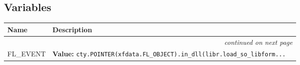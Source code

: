   \subsection{Variables}

    \vspace{-1cm}
\hspace{\varindent}\begin{longtable}{|p{\varnamewidth}|p{\vardescrwidth}|l}
\cline{1-2}
\cline{1-2} \centering \textbf{Name} & \centering \textbf{Description}& \\
\cline{1-2}
\endhead\cline{1-2}\multicolumn{3}{r}{\small\textit{continued on next page}}\\\endfoot\cline{1-2}
\endlastfoot\raggedright F\-L\-\_\-E\-V\-E\-N\-T\- & \raggedright \textbf{Value:} 
{\tt cty.POINTER(xfdata.FL\_OBJECT).in\_dll(libr.load\_so\_libform\texttt{...}}&\\
\cline{1-2}
\end{longtable}

